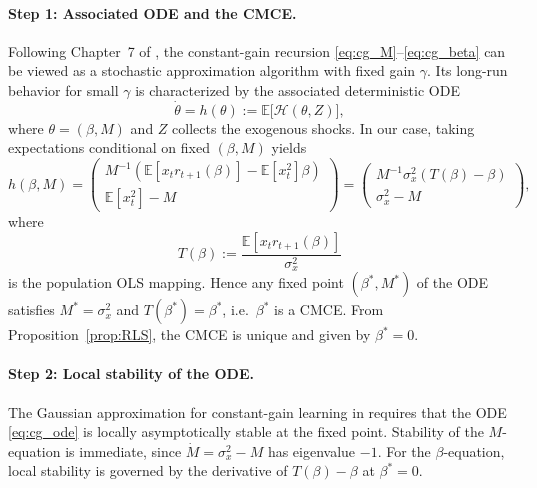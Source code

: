 \documentclass[11pt]{article}
\begin{document}
\paragraph{Step 1: Associated ODE and the CMCE.}
Following Chapter~7 of \citet{GeorgeWEvans2001}, the constant-gain recursion \eqref{eq:cg_M}--\eqref{eq:cg_beta} can be viewed as a stochastic approximation algorithm with fixed gain $\gamma$.
Its long-run behavior for small $\gamma$ is characterized by the associated deterministic ODE
\begin{equation}\label{eq:cg_ode}
    \dot\theta = h(\theta):=\mathbb E\big[\mathcal H(\theta,Z)\big],
\end{equation}
where $\theta=(\beta,M)$ and $Z$ collects the exogenous shocks.
In our case, taking expectations conditional on fixed $(\beta,M)$ yields
\begin{equation}
    h(\beta,M)=
    \begin{pmatrix}
        M^{-1}\left(\mathbb E[x_t r_{t+1}(\beta)]-\mathbb E[x_t^2]\beta\right) \\
        \mathbb E[x_t^2]-M
    \end{pmatrix}
    =
    \begin{pmatrix}
        M^{-1}\sigma_x^2\left(T(\beta)-\beta\right) \\
        \sigma_x^2-M
    \end{pmatrix},
\end{equation}
where
\begin{equation}\label{eq:Tmap_cg}
    T(\beta):=\frac{\mathbb E[x_t r_{t+1}(\beta)]}{\sigma_x^2}
\end{equation}
is the population OLS mapping. Hence any fixed point $(\beta^*,M^*)$ of the ODE satisfies $M^*=\sigma_x^2$ and $T(\beta^*)=\beta^*$, i.e.\ $\beta^*$ is a CMCE. From Proposition~\ref{prop:RLS}, the CMCE is unique and given by $\beta^*=0$.

\paragraph{Step 2: Local stability of the ODE.}
The Gaussian approximation for constant-gain learning in \citet[Ch.~7]{GeorgeWEvans2001} requires that the ODE \eqref{eq:cg_ode} is locally asymptotically stable at the fixed point.
Stability of the $M$-equation is immediate, since $\dot M=\sigma_x^2-M$ has eigenvalue $-1$.
For the $\beta$-equation, local stability is governed by the derivative of $T(\beta)-\beta$ at $\beta^*=0$.
\end{document}
